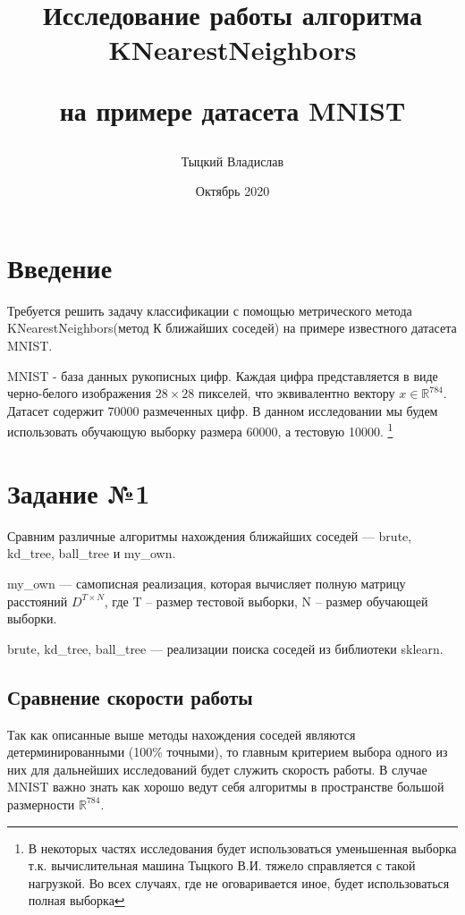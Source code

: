 \documentclass[12pt,fleqn]{article}
\title{Исследование работы алгоритма KNearestNeighbors 

на примере датасета MNIST}
\author{Тыцкий Владислав}
\date{Октябрь 2020}
\begin{document}
\maketitle

\section{Введение}
Требуется решить задачу классификации с помощью метрического метода KNearestNeighbors(метод К ближайших соседей)
 на примере известного датасета  MNIST.
 
 MNIST - база данных рукописных цифр. Каждая цифра представляется в виде  черно-белого изображения  $28\times28$ пикселей,
  что эквивалентно вектору 
 $x \in \mathbb{R}^{784}$. Датасет содержит 70000 размеченных цифр. В данном исследовании мы будем использовать 
 обучающую выборку размера 60000, а тестовую 10000.
 \footnote{В некоторых частях исследования будет использоваться уменьшенная выборка т.к. вычислительная 
 машина Тыцкого В.И. тяжело справляется с такой нагрузкой. Во всех случаях, где не оговаривается иное,
 будет использоваться полная выборка}

\section{Задание №1}
Сравним различные алгоритмы нахождения ближайших соседей --- brute, kd\_tree, ball\_tree и my\_own. 

my\_own --- самописная реализация, которая вычисляет полную матрицу расстояний $D^{T \times N}$, где T -- размер 
тестовой выборки, N -- размер обучающей выборки.

brute, kd\_tree, ball\_tree --- реализации поиска соседей из библиотеки sklearn.
\subsection{Сравнение скорости работы}
Так как описанные выше методы нахождения соседей являются детерминированными (100\% точными), то главным критерием 
выбора одного из них для дальнейших исследований будет служить скорость работы.
В случае MNIST важно знать как хорошо ведут себя алгоритмы в пространстве большой размерности $\mathbb{R}^{784}$. 
\end{document}
